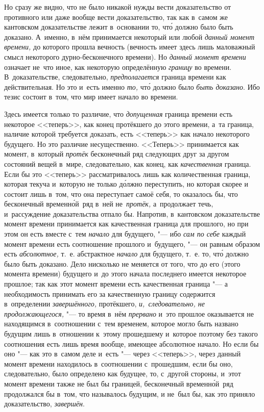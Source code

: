 Но сразу же видно, что не было никакой нужды вести доказательство от противного
или даже вообще вести доказательство, так как в~самом же кантовском
доказательстве лежит в~основании то, чт\'{о} должно было быть доказано. А~именно,
в~нём принимается некоторый или любой {\em данный момент времени,} до которого
прошла вечность (вечность имеет здесь лишь маловажный смысл некоторого
дурно-бесконечного времени). Но {\em данный момент времени} означает
не~что иное, как некоторую определённую {\em границу} во времени.
В~доказательстве, следовательно, {\em предполагается} граница времени как
действительная. Но это и~есть именно {\em то,} чт\'{о} должно было
{\em быть доказано}. Ибо тезис состоит в~том, что мир имеет начало во времени.

Здесь имеется только то различие, что {\em допущенная} граница времени есть
некоторое <<теперь>>, как конец протёкшего до этого времени, а~та граница,
наличие которой требуется доказать, есть <<теперь>> как начало некоторого
будущего. Но это различие несущественно. <<Теперь>> принимается как момент,
в~который {\em протёк} бесконечный ряд следующих друг за другом состояний вещей
в~мире, следовательно, как конец, как {\em качественная} граница. Если бы это
<<теперь>> рассматривалось лишь как количественная граница, которая
текуча и~которую не только д\'{о}лжно переступить, но которая скорее и
состоит лишь в~том, что она переступает самоё себя, то оказалось бы, что бесконечный
временн\'{о}й~ряд в~ней не~{\em протёк,} а~продолжает течь, и~рассуждение
доказательства отпало бы. Напротив, в~кантовском доказательстве момент времени
принимается как качественная граница для прошлого, но при этом он есть вместе
с~тем {\em начало} для будущего, "--- ибо {\em сам по себе} каждый момент
времени есть соотношение прошлого и~будущего, "--- он равным образом есть
{\em абсолютное,} т.~е. абстрактное {\em начало} для будущего, т.~е. то, чт\'{о}
должно было быть доказано. Дело нисколько не меняется от того, что до его
(этого момента времени) будущего и~до этого начала последнего имеется некоторое
прошлое; так как этот момент времени есть качественная граница "--- а
необходимость принимать его за качественную границу содержится в~определении
{\em завершённого,} протёкшего, {\em и,~следовательно, не продолжающегося,}
"--- то время в~нём {\em прервано} и~это прошлое оказывается не находящимся
в~соотношении с~тем временем, которое могло быть названо будущим лишь в~отношении
к~этому прошедшему и~которое поэтому без такого соотношения есть лишь время
вообще, имеющее абсолютное начало. Но если бы оно "--- как это в~самом деле
и~есть "--- через <<теперь>>, через данный момент времени находилось
в~соотношении с~прошедшим, если бы оно, следовательно, было определено как
будущее, то, с~другой стороны, и~этот момент времени также не был бы границей,
бесконечный временн\'{о}й~ряд продолжался бы в~том, что называлось будущим, и
не~был бы, как это приняло доказательство, {\em завершён}.

